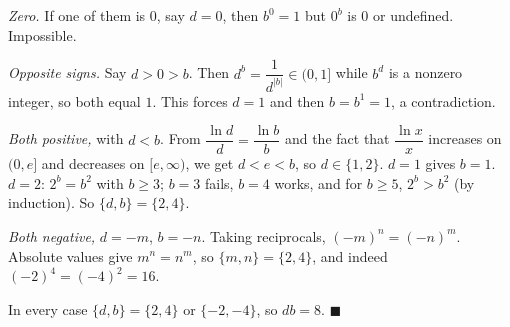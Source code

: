 \emph{Zero.} If one of them is $0$, say $d=0$, then $b^0=1$ but $0^b$ is $0$ or undefined. Impossible.

\emph{Opposite signs.} Say $d>0>b$. Then $d^b=\dfrac1{d^{|b|}}\in(0,1]$ while $b^d$ is a nonzero integer, so both equal $1$. This forces $d=1$ and then $b=b^1=1$, a contradiction.

\emph{Both positive,} with $d<b$. From $\dfrac{\ln d}d=\dfrac{\ln b}b$ and the fact that $\dfrac{\ln x}x$ increases on $(0,e]$ and decreases on $[e,\infty)$, we get $d<e<b$, so $d\in\{1,2\}$. $d=1$ gives $b=1$. $d=2$: $2^b=b^2$ with $b\ge3$; $b=3$ fails, $b=4$ works, and for $b\ge5$, $2^b>b^2$ (by induction). So $\{d,b\}=\{2,4\}$.

\emph{Both negative,} $d=-m$, $b=-n$. Taking reciprocals, $(-m)^n=(-n)^m$. Absolute values give $m^n=n^m$, so $\{m,n\}=\{2,4\}$, and indeed $(-2)^4=(-4)^2=16$.

In every case $\{d,b\}=\{2,4\}$ or $\{-2,-4\}$, so $db=8$. $\blacksquare$
